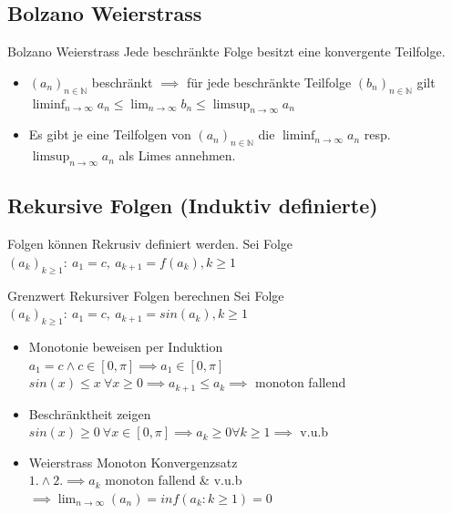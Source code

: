 \documentclass[a4paper]{article}
\def\limn{\lim_{n\to \infty}}
\newcommand\N{\ensuremath{\mathbb{N}}}
\begin{document}
\subsection{Bolzano Weierstrass}
\begin{subbox}{Bolzano Weierstrass}
  Jede beschränkte Folge besitzt eine konvergente Teilfolge.
\end{subbox}
\begin{itemize}[leftmargin=4.5mm, topsep=1pt, parsep=1pt]
    \item $(a_n)_{n \in \N}$ beschränkt $\implies$ für jede beschränkte Teilfolge $(b_n)_{n \in \N}$ gilt $\liminf_{n \to \infty} a_n \le \lim_{n \to \infty} b_n \le  \limsup_{n \to \infty} a_n$
    \item Es gibt je eine Teilfolgen von $(a_n)_{n \in \N}$ die $\liminf_{n \to \infty} a_n$ resp. $\limsup_{n \to \infty} a_n$ als Limes annehmen.
\end{itemize}

\subsection{Rekursive Folgen (Induktiv definierte)}
Folgen können Rekrusiv definiert werden. Sei Folge $(a_k)_{k \geq 1}: \ a_1 = c, \ a_{k+1} = f(a_k), k \geq 1$
\begin{bspbox}{Grenzwert Rekursiver Folgen berechnen}
  Sei Folge $(a_k)_{k \geq 1}: \ a_1 = c, \ a_{k+1} = sin(a_k), k \geq 1$
  \begin{itemize}[leftmargin=3mm, topsep=1pt, parsep=1pt]
    \item[1.] Monotonie beweisen per Induktion \\
          $a_1 = c \land c \in [0, \pi] \implies a_1 \in [0, \pi]$ \\
          $sin(x) \leq x \ \forall x \geq 0 \implies a_{k+1} \leq a_k \implies $ monoton fallend
    \item[2.] Beschränktheit zeigen \\
          $sin(x) \geq 0 \ \forall x \in [0, \pi] \implies a_k \geq 0 \forall k \geq 1 \implies$ v.u.b \\
    \item[3.] Weierstrass Monoton Konvergenzsatz \\
          $1. \land 2. \implies a_k$ monoton fallend \& v.u.b \\
          $\implies \limn (a_n) = inf(a_k : k \geq 1) = 0$ 
  \end{itemize}
\end{bspbox}
\end{document}
